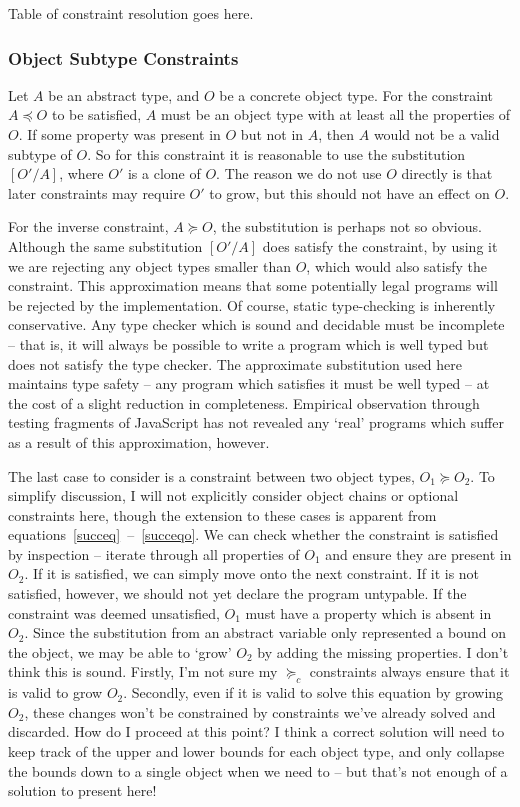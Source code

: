 \documentclass[12pt,a4paper,twoside,openright]{report}
\theoremstyle{definition}
\theoremstyle{dotless}
\begin{document}
{\color{red}Table of constraint resolution goes here.}

\subsubsection*{Object Subtype Constraints} 
Let $A$ be an abstract type, and $O$ be a concrete object type. For the
constraint $A \preceq O$ to be satisfied, $A$ must be an object type with at
least all the properties of $O$. If some property was present in $O$ but not in
$A$, then $A$ would not be a valid subtype of $O$. So for this constraint it is
reasonable to use the substitution $[O'/A]$, where $O'$ is a clone of $O$. The
reason we do not use $O$ directly is that later constraints may require $O'$ to
grow, but this should not have an effect on $O$.

For the inverse constraint, $A\succeq O$, the substitution is perhaps not so
obvious. Although the same substitution $[O'/A]$ does satisfy the constraint,
by using it we are rejecting any object types smaller than $O$, which would
also satisfy the constraint. This approximation means that some potentially
legal programs will be rejected by the implementation. Of course, static
type-checking is inherently conservative.  Any type checker which is sound and
decidable must be incomplete -- that is, it will always be possible to write a
program which is well typed but does not satisfy the type checker. The
approximate substitution used here maintains type safety -- any program which
satisfies it must be well typed -- at the cost of a slight reduction in
completeness. Empirical observation through testing fragments of JavaScript has
not revealed any `real' programs which suffer as a result of this
approximation, however.

The last case to consider is a constraint between two object types, $O_1\succeq
O_2$. To simplify discussion, I will not explicitly consider object chains or
optional constraints here, though the extension to these cases is apparent from
equations~\ref{succeq}~--~\ref{succeqo}. We can check whether the constraint is
satisfied by inspection -- iterate through all properties of $O_1$ and ensure
they are present in $O_2$. If it is satisfied, we can simply move onto the next
constraint. If it is not satisfied, however, we should not yet declare the
program untypable. If the constraint was deemed unsatisfied, $O_1$ must have a
property which is absent in $O_2$. Since the substitution from an abstract
variable only represented a bound on the object, we may be able to `grow' $O_2$
by adding the missing properties.  
{\color{red}I don't think this is sound.
  Firstly, I'm not sure my $\succeq_c$ constraints always ensure that it is
  valid to grow $O_2$. Secondly, even if it is valid to solve this equation by
  growing $O_2$, these changes won't be constrained by constraints we've
  already solved and discarded. How do I proceed at this point?  I think a
  correct solution will need to keep track of the upper and lower bounds for
  each object type, and only collapse the bounds down to a single object when
  we need to -- but that's not enough of a solution to present here!}
\end{document}
